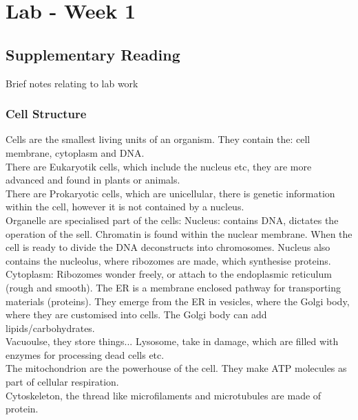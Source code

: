 \section{Lab - Week 1}

\subsection{Supplementary Reading}

Brief notes relating to lab work

\subsubsection{Cell Structure}
Cells are the smallest living units of an organism. They contain the: cell membrane, cytoplasm and DNA. \\

\noindent There are Eukaryotik cells, which include the nucleus etc, they are more advanced and found in plants or animals. \\

\noindent There are Prokaryotic cells, which are unicellular, there is genetic information within the cell, however it is not contained by a nucleus.\\

\noindent Organelle are specialised part of the cells:
Nucleus: contains DNA, dictates the operation of the sell. Chromatin is found within the nuclear membrane. When the cell is ready to divide the DNA deconstructs into chromosomes. Nucleus also contains the nucleolus, where ribozomes are made, which synthesise proteins. \\

\noindent Cytoplasm: Ribozomes wonder freely, or attach to the endoplasmic reticulum (rough and smooth). The ER is a membrane enclosed pathway for transporting materials (proteins). They emerge from the ER in vesicles, where the Golgi body, where they are customised into cells. The Golgi body can add lipids/carbohydrates.\\

\noindent Vacuoulse, they store things... Lysosome, take in damage, which are filled with enzymes for processing dead cells etc. \\

\noindent The mitochondrion are the powerhouse of the cell. They make ATP molecules as part of cellular respiration. \\

\noindent Cytoskeleton, the thread like microfilaments and microtubules are made of protein. \\

